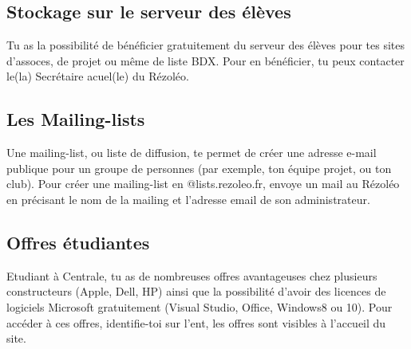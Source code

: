 \documentclass[12pt]{article}
\begin{document}
{  \subsection{Stockage sur le serveur des élèves}
    Tu as la possibilité de bénéficier gratuitement du serveur des élèves pour tes sites d’assoces, de projet ou même de liste BDX. Pour en bénéficier, tu peux contacter le(la) Secrétaire acuel(le) du Rézoléo.
  \subsection{Les Mailing-lists}
    Une mailing-list, ou liste de diffusion, te permet de créer une adresse e-mail publique pour un groupe de personnes (par exemple, ton équipe projet, ou ton club).
    Pour créer une mailing-list en @lists.rezoleo.fr, envoye un mail au Rézoléo en précisant le nom de la mailing et l’adresse email de son administrateur.
  \subsection{Offres étudiantes}
    Etudiant à Centrale, tu as de nombreuses offres avantageuses chez plusieurs constructeurs (Apple, Dell, HP) ainsi que la possibilité d’avoir des licences de logiciels Microsoft gratuitement (Visual Studio, Office, Windows8 ou 10).
    Pour accéder à ces offres, identifie-toi sur l’ent, les offres sont visibles à l'accueil du site.
}
\end{document}
